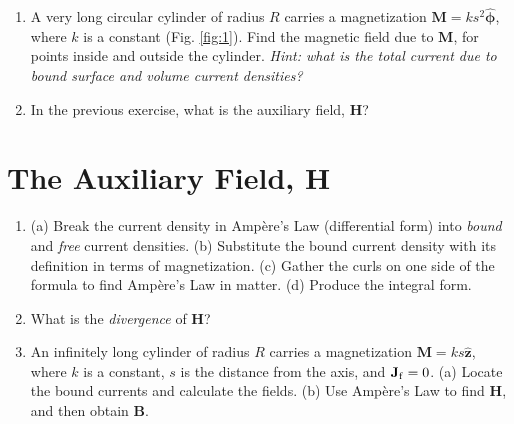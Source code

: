 \documentclass[10pt]{article}
\begin{document}
\begin{enumerate}
\item A very long circular cylinder of radius $R$ carries a magnetization $\mathbf{M} = ks^2\hat{\boldsymbol{\phi}}$, where $k$ is a constant (Fig. \ref{fig:1}).  Find the magnetic field due to $\mathbf{M}$, for points inside and outside the cylinder. \textit{Hint: what is the total current due to bound surface and volume current densities?}\\ \vspace{4cm}
\item In the previous exercise, what is the auxiliary field, $\mathbf{H}$? \\ \vspace{2cm}
\end{enumerate}

\section{The Auxiliary Field, $\mathbf{H}$}

\begin{enumerate}
\item (a) Break the current density in Amp\`{e}re's Law (differential form) into \textit{bound} and \textit{free} current densities.  (b) Substitute the bound current density with its definition in terms of magnetization.  (c) Gather the curls on one side of the formula to find Amp\`{e}re's Law in matter.  (d) Produce the integral form. \\ \vspace{2.5cm}
\item What is the \textit{divergence} of $\mathbf{H}$? \\ \vspace{1cm}
\item An infinitely long cylinder of radius $R$ carries a magnetization $\mathbf{M} = ks \hat{\mathbf{z}}$, where $k$ is a constant, $s$ is the distance from the axis, and $\mathbf{J}_{\rm f}=0$. (a) Locate the bound currents and calculate the fields. (b) Use Amp\`{e}re's Law to find $\mathbf{H}$, and then obtain $\mathbf{B}$.
\end{enumerate}
\end{document}
